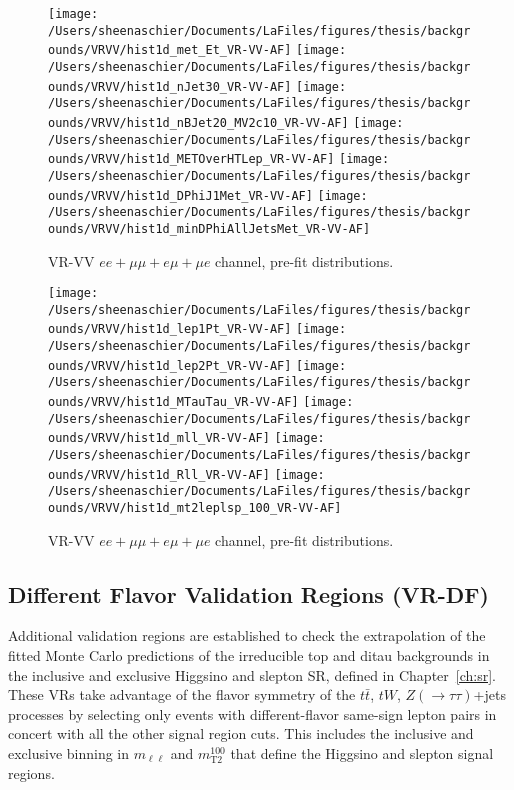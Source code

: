 \begin{figure}
    \centering
        \texttt{[image: /Users/sheenaschier/Documents/LaFiles/figures/thesis/backgrounds/VRVV/hist1d\_met\_Et\_VR-VV-AF]}
        \texttt{[image: /Users/sheenaschier/Documents/LaFiles/figures/thesis/backgrounds/VRVV/hist1d\_nJet30\_VR-VV-AF]}
        \texttt{[image: /Users/sheenaschier/Documents/LaFiles/figures/thesis/backgrounds/VRVV/hist1d\_nBJet20\_MV2c10\_VR-VV-AF]}
        \texttt{[image: /Users/sheenaschier/Documents/LaFiles/figures/thesis/backgrounds/VRVV/hist1d\_METOverHTLep\_VR-VV-AF]}
        \texttt{[image: /Users/sheenaschier/Documents/LaFiles/figures/thesis/backgrounds/VRVV/hist1d\_DPhiJ1Met\_VR-VV-AF]}
        \texttt{[image: /Users/sheenaschier/Documents/LaFiles/figures/thesis/backgrounds/VRVV/hist1d\_minDPhiAllJetsMet\_VR-VV-AF]}
    \caption{VR-VV $ee+\mu\mu +e\mu + \mu e$ channel, pre-fit distributions.}
    \label{fig:VR-VV-AF-set1vars}
\end{figure} 


\begin{figure}
    \centering
        \texttt{[image: /Users/sheenaschier/Documents/LaFiles/figures/thesis/backgrounds/VRVV/hist1d\_lep1Pt\_VR-VV-AF]}
        \texttt{[image: /Users/sheenaschier/Documents/LaFiles/figures/thesis/backgrounds/VRVV/hist1d\_lep2Pt\_VR-VV-AF]}
        \texttt{[image: /Users/sheenaschier/Documents/LaFiles/figures/thesis/backgrounds/VRVV/hist1d\_MTauTau\_VR-VV-AF]}
        \texttt{[image: /Users/sheenaschier/Documents/LaFiles/figures/thesis/backgrounds/VRVV/hist1d\_mll\_VR-VV-AF]}
        \texttt{[image: /Users/sheenaschier/Documents/LaFiles/figures/thesis/backgrounds/VRVV/hist1d\_Rll\_VR-VV-AF]}
        \texttt{[image: /Users/sheenaschier/Documents/LaFiles/figures/thesis/backgrounds/VRVV/hist1d\_mt2leplsp\_100\_VR-VV-AF]}
    \caption{VR-VV $ee+\mu\mu +e\mu + \mu e$ channel, pre-fit distributions.}
    \label{fig:VR-VV-AF-set2vars}
\end{figure}

\subsection{Different Flavor Validation Regions (VR-DF)}
Additional validation regions are established to check the extrapolation of the fitted Monte Carlo predictions of the irreducible top and ditau backgrounds in the inclusive and exclusive Higgsino and slepton SR, defined in Chapter~\ref{ch:sr}.  These VRs take advantage of the flavor symmetry of the $t\bar{t}$, $tW$, $Z(\rightarrow\tau\tau)$+jets processes by selecting only events with different-flavor same-sign lepton pairs in concert with all the other signal region cuts.  This includes the inclusive and exclusive binning in $m_{\ell\ell}$ and $m_{\mathrm{T}2}^{100}$ that define the Higgsino and slepton signal regions.

